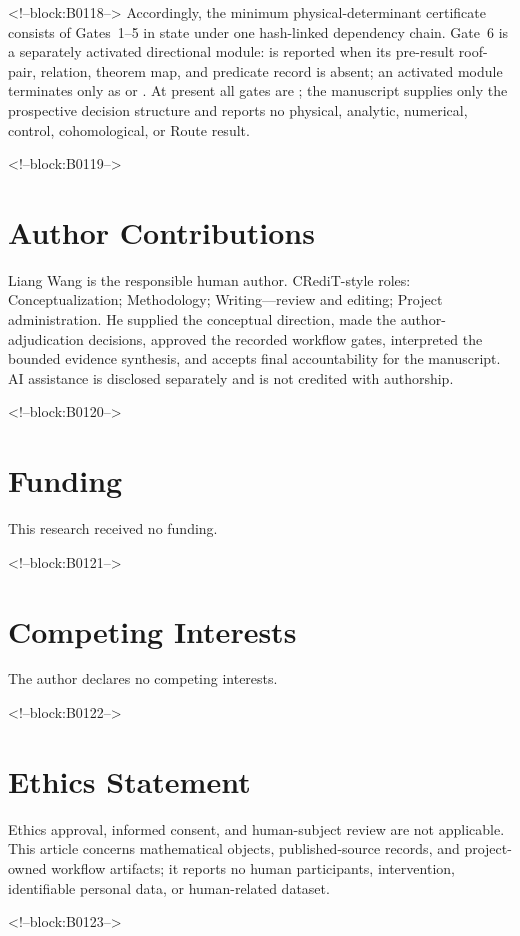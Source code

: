 \documentclass[11pt,a4paper]{article}
\begin{document}
<!--block:B0118-->
Accordingly, the minimum physical-determinant certificate consists of Gates~1--5 in  state under one hash-linked dependency chain. Gate~6 is a separately activated directional module:  is reported when its pre-result roof-pair, relation, theorem map, and predicate record is absent; an activated module terminates only as  or . At present all gates are ; the manuscript supplies only the prospective decision structure and reports no physical, analytic, numerical, control, cohomological, or Route result.

<!--block:B0119-->
\section*{Author Contributions}
Liang Wang is the responsible human author. CRediT-style roles: Conceptualization; Methodology; Writing---review and editing; Project administration. He supplied the conceptual direction, made the author-adjudication decisions, approved the recorded workflow gates, interpreted the bounded evidence synthesis, and accepts final accountability for the manuscript. AI assistance is disclosed separately and is not credited with authorship.

<!--block:B0120-->
\section*{Funding}
This research received no funding.

<!--block:B0121-->
\section*{Competing Interests}
The author declares no competing interests.

<!--block:B0122-->
\section*{Ethics Statement}
Ethics approval, informed consent, and human-subject review are not applicable. This article concerns mathematical objects, published-source records, and project-owned workflow artifacts; it reports no human participants, intervention, identifiable personal data, or human-related dataset.

<!--block:B0123-->
\end{document}
